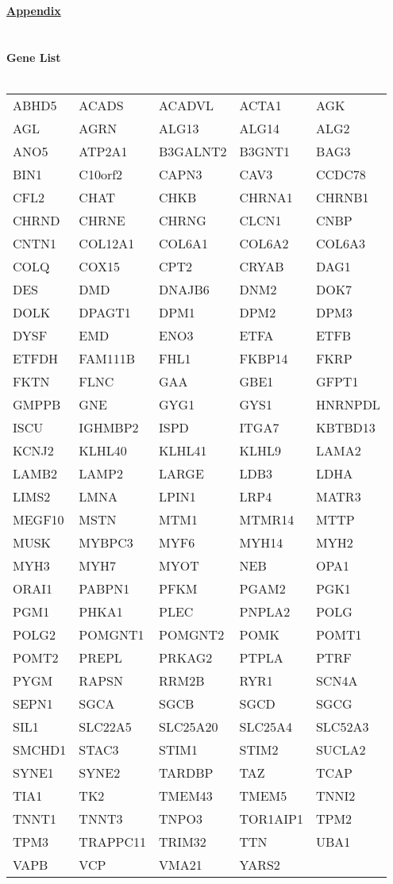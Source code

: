{\Large \textbf{\underline{Appendix}}}
\\ \\ \\
{\Large \textbf{{Gene List}}}
\\ \\
\begin{small}
\begin{tabular}{ |p{3cm}|p{3cm}|p{3cm}|p{3cm}|p{3cm}| }
\hline

ABHD5 & ACADS & ACADVL & ACTA1 & AGK \\
AGL & AGRN & ALG13 & ALG14 & ALG2 \\
ANO5 & ATP2A1 & B3GALNT2 & B3GNT1 & BAG3 \\
BIN1 & C10orf2 & CAPN3 & CAV3 & CCDC78 \\
CFL2 & CHAT & CHKB & CHRNA1 & CHRNB1 \\
CHRND & CHRNE & CHRNG & CLCN1 & CNBP \\
CNTN1 & COL12A1 & COL6A1 & COL6A2 & COL6A3 \\
COLQ & COX15 & CPT2 & CRYAB & DAG1 \\
DES & DMD & DNAJB6 & DNM2 & DOK7 \\
DOLK & DPAGT1 & DPM1 & DPM2 & DPM3 \\
DYSF & EMD & ENO3 & ETFA & ETFB \\
ETFDH & FAM111B & FHL1 & FKBP14 & FKRP \\
FKTN & FLNC & GAA & GBE1 & GFPT1 \\
GMPPB & GNE & GYG1 & GYS1 & HNRNPDL \\
ISCU & IGHMBP2 & ISPD & ITGA7 & KBTBD13 \\
KCNJ2 & KLHL40 & KLHL41 & KLHL9 & LAMA2 \\
LAMB2 & LAMP2 & LARGE & LDB3 & LDHA \\
LIMS2 & LMNA & LPIN1 & LRP4 & MATR3 \\
MEGF10 & MSTN & MTM1 & MTMR14 & MTTP \\
MUSK & MYBPC3 & MYF6 & MYH14 & MYH2 \\
MYH3 & MYH7 & MYOT & NEB & OPA1 \\
ORAI1 & PABPN1 & PFKM & PGAM2 & PGK1 \\
PGM1 & PHKA1 & PLEC & PNPLA2 & POLG \\
POLG2 & POMGNT1 & POMGNT2 & POMK & POMT1 \\
POMT2 & PREPL & PRKAG2 & PTPLA & PTRF \\
PYGM & RAPSN & RRM2B & RYR1 & SCN4A \\
SEPN1 & SGCA & SGCB & SGCD & SGCG \\
SIL1 & SLC22A5 & SLC25A20 & SLC25A4 & SLC52A3 \\
SMCHD1 & STAC3 & STIM1 & STIM2 & SUCLA2 \\
SYNE1 & SYNE2 & TARDBP & TAZ & TCAP \\
TIA1 & TK2 & TMEM43 & TMEM5 & TNNI2 \\
TNNT1 & TNNT3 & TNPO3 & TOR1AIP1 & TPM2 \\
TPM3 & TRAPPC11 & TRIM32 & TTN & UBA1 \\
VAPB & VCP & VMA21 & YARS2 & \\

\hline
\end{tabular}
\end{small}
\newpage
